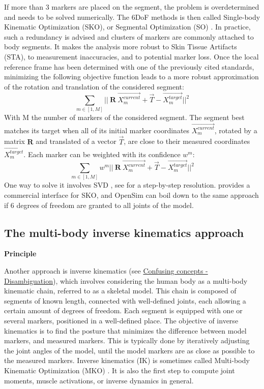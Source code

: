 If more than 3 markers are placed on the segment, the problem is overdetermined and needs to be solved numerically. The 6DoF methods is then called Single-body Kinematic Optimization (SKO), or Segmental Optimization (SO) \cite{Lu1999}. In practice, such a redundancy is advised and clusters of markers are commonly attached to body segments. It makes the analysis more robust to Skin Tissue Artifacts (STA), to measurement inaccuracies, and to potential marker loss. Once the local reference frame has been determined with one of the previously cited standards, minimizing the following objective function leads to a more robust approximation of the rotation and translation of the considered segment: 
\begin{equation}
  \sum_{m \in [1,M]}
  ||\ \textbf{R} \ \overrightarrow{X^{current}_m} + \overrightarrow{T} - \overrightarrow{X^{target}_m} ||^2
\end{equation} 
With M the number of markers of the considered segment. The segment best matches its target when all of its initial marker coordinates $\overrightarrow{X^{current}_m}$, rotated by a matrix $\textbf{R}$ and translated of a vector $\overrightarrow{T}$, are close to their measured coordinates $\overrightarrow{X^{target}_m}$. Each marker can be weighted with its confidence $w^m$:
\begin{equation}\label{eq:weighted_sko}
  \sum_{m \in [1,M]}
  w^m ||\ \textbf{R} \ \overrightarrow{X^{current}_m} + \overrightarrow{T} - \overrightarrow{X^{target}_m} ||^2
\end{equation} 
One way to solve it involves SVD \cite{Arun1987,Soderkvist1993}, see \cite{Sorkine2017} for a step-by-step resolution. \cite{Visual3D} provides a commercial interface for SKO, and OpenSim can boil down to the same approach if 6 degrees of freedom are granted to all joints of the model.


\newpage
\subsection{The multi-body inverse kinematics approach}\label{invkin}

\noindent\textbf{Principle}

Another approach is inverse kinematics (see \hyperlink{Ann:gloss}{Confusing concepts - Disambiguation}), which involves considering the human body as a multi-body kinematic chain, referred to as a skeletal model. This chain is composed of segments of known length, connected with well-defined joints, each allowing a certain amount of degrees of freedom. Each segment is equipped with one or several markers, positioned in a well-defined place. The objective of inverse kinematics is to find the posture that minimizes the difference between model markers, and measured markers. This is typically done by iteratively adjusting the joint angles of the model, until the model markers are as close as possible to the measured markers. Inverse kinematics (IK) is sometimes called Multi-body Kinematic Optimization (MKO) \cite{Begon2018}. It is also the first step to compute joint moments, muscle activations, or inverse dynamics in general.

